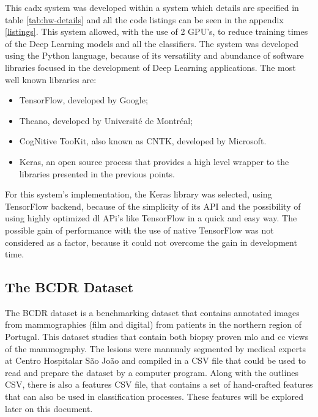 \documentclass[
  twoside,
  11pt, a4paper,
  footinclude=true,
  headinclude=true,
  cleardoublepage=empty
]{scrbook}
\begin{document}
      This \gls{cadx} system was developed within a system which details are specified in table \ref{tab:hw-details} and all the code listings can be seen in the appendix \ref{listings}. This system allowed, with the use of 2 GPU's, to reduce training times of the Deep Learning models and all the classifiers. The system was developed using the Python language, because of its versatility and abundance of software libraries focused in the development of Deep Learning applications. The most well known libraries are:

      \begin{itemize}
          \item TensorFlow, developed by Google;
          \item Theano, developed by Université de Montréal;
          \item CogNitive TooKit, also known as CNTK, developed by Microsoft.
          \item Keras, an open source process that provides a high level wrapper to the libraries presented in the previous points.
      \end{itemize}

      For this system's implementation, the Keras library was selected, using TensorFlow backend, because of the simplicity of its API and the possibility of using highly optimized \gls{dl} APi's like TensorFlow in a quick and easy way. The possible gain of performance with the use of native TensorFlow was not considered as a factor, because it could not overcome the gain in development time.

      \subsection{The BCDR Dataset}


        The BCDR dataset \cite{lopez2012bcdr} is a benchmarking dataset that contains annotated images from mammographies (film and digital) from patients in the northern region of Portugal. This dataset studies that contain both biopsy proven \gls{mlo} and \gls{cc} views of the mammography. The lesions were mannualy segmented by medical experts at Centro Hospitalar São João and compiled in a CSV file that could be used to read and prepare the dataset by a computer program. Along with the outlines CSV, there is also a features CSV file, that contains a set of hand-crafted features that can also be used in classification processes. These features will be explored later on this document.
\end{document}
